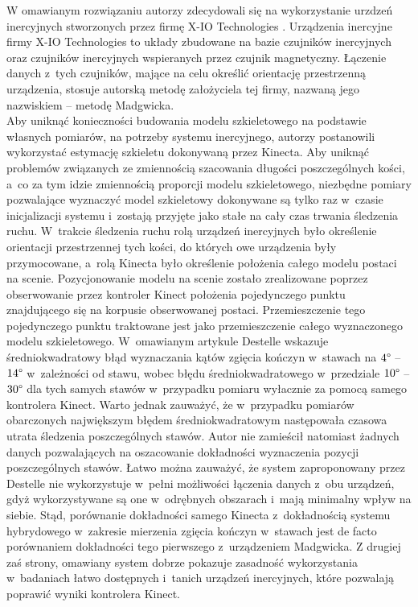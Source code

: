 W omawianym rozwiązaniu autorzy zdecydowali się na wykorzystanie urzdzeń inercyjnych stworzonych przez firmę X-IO Technologies . Urządzenia inercyjne firmy X-IO Technologies to układy zbudowane na bazie czujników inercyjnych oraz czujników inercyjnych wspieranych przez czujnik magnetyczny. Łączenie danych z~tych czujników, mające na celu określić orientację przestrzenną urządzenia, stosuje autorską metodę założyciela tej firmy, nazwaną jego nazwiskiem -- metodę Madgwicka.\\
Aby uniknąć konieczności budowania modelu szkieletowego na podstawie własnych pomiarów, na potrzeby systemu inercyjnego, autorzy postanowili wykorzystać estymację szkieletu dokonywaną przez Kinecta. Aby uniknąć problemów związanych ze zmiennością szacowania długości poszczególnych kości, a~co za tym idzie zmiennością proporcji modelu szkieletowego, niezbędne pomiary pozwalające wyznaczyć model szkieletowy dokonywane są tylko raz w~czasie inicjalizacji systemu i~zostają przyjęte jako stałe na cały czas trwania śledzenia ruchu. W~trakcie śledzenia ruchu rolą urządzeń inercyjnych było określenie orientacji przestrzennej tych kości, do których owe urządzenia były przymocowane, a~rolą Kinecta było określenie położenia całego modelu postaci na scenie. Pozycjonowanie modelu na scenie zostało zrealizowane poprzez obserwowanie przez kontroler Kinect położenia pojedynczego punktu znajdującego się na korpusie obserwowanej postaci. Przemieszczenie tego pojedynczego punktu traktowane jest jako przemieszczenie całego wyznaczonego modelu szkieletowego. W~omawianym artykule Destelle wskazuje średniokwadratowy błąd wyznaczania kątów zgięcia kończyn w~stawach na $4\degree$ -- $14\degree$ w~zależności od stawu, wobec błędu średniokwadratowego w~przedziale $10\degree$ -- $30\degree$ dla tych samych stawów w~przypadku pomiaru wyłacznie za pomocą samego kontrolera Kinect. Warto jednak zauważyć, że w~przypadku pomiarów obarczonych największym błędem średniokwadratowym następowała czasowa utrata śledzenia poszczególnych stawów. Autor nie zamieścił natomiast żadnych danych pozwalających na oszacowanie dokładności wyznaczenia pozycji poszczególnych stawów. Łatwo można zauważyć, że system zaproponowany przez Destelle nie wykorzystuje w~pełni możliwości łączenia danych z~obu urządzeń, gdyż wykorzystywane są one w~odrębnych obszarach i~mają minimalny wpływ na siebie. Stąd, porównanie dokładności samego Kinecta z~dokładnością systemu hybrydowego w~zakresie mierzenia zgięcia kończyn w~stawach jest de facto porównaniem dokładności tego pierwszego z~urządzeniem Madgwicka. Z drugiej zaś strony, omawiany system dobrze pokazuje zasadność wykorzystania w~badaniach łatwo dostępnych i~tanich urządzeń inercyjnych, które pozwalają poprawić wyniki kontrolera Kinect.\\
																																																	
